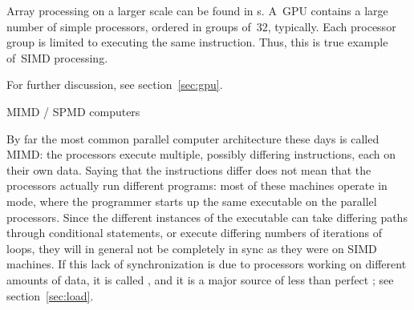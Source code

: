 Array processing on a larger scale can be found in
s. A~\ac{GPU} contains a large number of simple
processors, ordered in groups of~32, typically. Each processor group
is limited to executing the same instruction. Thus, this is true
example of~\ac{SIMD} processing.
\begin{gpu}
For further discussion, see section~\ref{sec:gpu}.
\end{gpu}

 {MIMD / SPMD computers}
\label{sec:mimd}\label{sec:spmd}

By far the most common parallel computer architecture these days is
called \acf{MIMD}: the processors execute multiple, possibly differing
instructions, each on their own data. Saying that the instructions
differ does not mean that the processors actually run different
programs: most of these machines operate in  mode, where the
programmer starts up the same executable on the parallel processors.
Since the different instances of the executable can take differing
paths through conditional statements, or execute differing numbers of
iterations of loops, they will in general not be completely in sync as
they were on \ac{SIMD} machines. If this lack of synchronization is
due to processors working on different amounts of data, it is
called , and it is a major source of less
than perfect ; see section~\ref{sec:load}.

